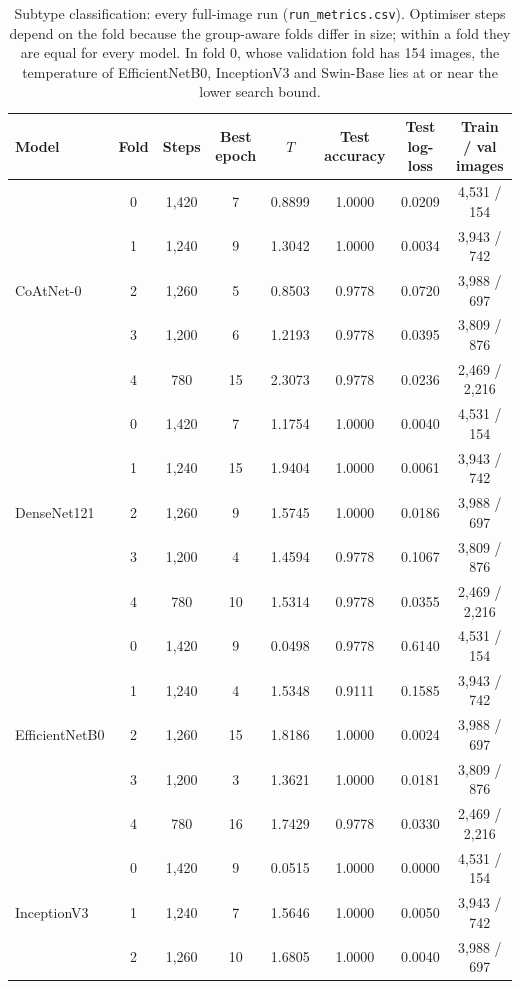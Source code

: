 \documentclass[11pt]{article}
\begin{document}
\begin{table}[htbp]
\centering
\caption{Subtype classification: every full-image run (\texttt{run\_metrics.csv}). Optimiser steps depend on the fold because the group-aware folds differ in size; within a fold they are equal for every model. In fold 0, whose validation fold has 154 images, the temperature of EfficientNetB0, InceptionV3 and Swin-Base lies at or near the lower search bound.}
\scriptsize
\begin{tabular*}{\textwidth}{@{\extracolsep{\fill}}lccccccc@{}}
\toprule
Model & Fold & Steps & Best epoch & $T$ & Test accuracy & Test log-loss & Train / val images \\
\midrule
\multirow{5}{*}{CoAtNet-0} & 0 & 1,420 & 7 & 0.8899 & 1.0000 & 0.0209 & 4,531 / 154 \\
 & 1 & 1,240 & 9 & 1.3042 & 1.0000 & 0.0034 & 3,943 / 742 \\
 & 2 & 1,260 & 5 & 0.8503 & 0.9778 & 0.0720 & 3,988 / 697 \\
 & 3 & 1,200 & 6 & 1.2193 & 0.9778 & 0.0395 & 3,809 / 876 \\
 & 4 & 780 & 15 & 2.3073 & 0.9778 & 0.0236 & 2,469 / 2,216 \\
\midrule
\multirow{5}{*}{DenseNet121} & 0 & 1,420 & 7 & 1.1754 & 1.0000 & 0.0040 & 4,531 / 154 \\
 & 1 & 1,240 & 15 & 1.9404 & 1.0000 & 0.0061 & 3,943 / 742 \\
 & 2 & 1,260 & 9 & 1.5745 & 1.0000 & 0.0186 & 3,988 / 697 \\
 & 3 & 1,200 & 4 & 1.4594 & 0.9778 & 0.1067 & 3,809 / 876 \\
 & 4 & 780 & 10 & 1.5314 & 0.9778 & 0.0355 & 2,469 / 2,216 \\
\midrule
\multirow{5}{*}{EfficientNetB0} & 0 & 1,420 & 9 & 0.0498 & 0.9778 & 0.6140 & 4,531 / 154 \\
 & 1 & 1,240 & 4 & 1.5348 & 0.9111 & 0.1585 & 3,943 / 742 \\
 & 2 & 1,260 & 15 & 1.8186 & 1.0000 & 0.0024 & 3,988 / 697 \\
 & 3 & 1,200 & 3 & 1.3621 & 1.0000 & 0.0181 & 3,809 / 876 \\
 & 4 & 780 & 16 & 1.7429 & 0.9778 & 0.0330 & 2,469 / 2,216 \\
\midrule
\multirow{5}{*}{InceptionV3} & 0 & 1,420 & 9 & 0.0515 & 1.0000 & 0.0000 & 4,531 / 154 \\
 & 1 & 1,240 & 7 & 1.5646 & 1.0000 & 0.0050 & 3,943 / 742 \\
 & 2 & 1,260 & 10 & 1.6805 & 1.0000 & 0.0040 & 3,988 / 697 \\

\end{tabular*}
\end{table}
\end{document}
